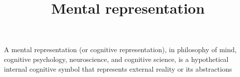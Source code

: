 \documentclass[a4paper]{article}
\title{Mental representation}
\date{}
\begin{document}
    \maketitle
    A mental representation (or cognitive representation), in philosophy of mind, cognitive psychology, neuroscience, and cognitive science, is a hypothetical internal cognitive symbol that represents external reality or its abstractions 
\end{document}
